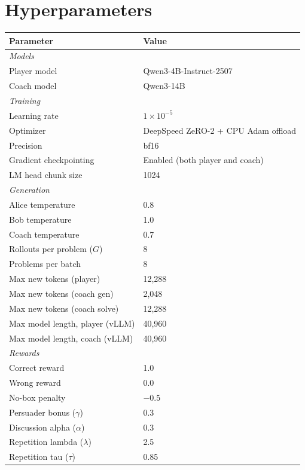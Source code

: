\documentclass{article}
\begin{document}
\section{Hyperparameters}
\label{sec:hyperparameters}

\begin{table}[h]
\centering
\small
\begin{tabular}{ll}
\toprule
\textbf{Parameter} & \textbf{Value} \\
\midrule
\multicolumn{2}{l}{\emph{Models}} \\
Player model & Qwen3-4B-Instruct-2507 \\
Coach model & Qwen3-14B \\
\midrule
\multicolumn{2}{l}{\emph{Training}} \\
Learning rate & $1 \times 10^{-5}$ \\
Optimizer & DeepSpeed ZeRO-2 + CPU Adam offload \\
Precision & bf16 \\
Gradient checkpointing & Enabled (both player and coach) \\
LM head chunk size & 1024 \\
\midrule
\multicolumn{2}{l}{\emph{Generation}} \\
Alice temperature & 0.8 \\
Bob temperature & 1.0 \\
Coach temperature & 0.7 \\
Rollouts per problem ($G$) & 8 \\
Problems per batch & 8 \\
Max new tokens (player) & 12,288 \\
Max new tokens (coach gen) & 2,048 \\
Max new tokens (coach solve) & 12,288 \\
Max model length, player (vLLM) & 40,960 \\
Max model length, coach (vLLM) & 40,960 \\
\midrule
\multicolumn{2}{l}{\emph{Rewards}} \\
Correct reward & 1.0 \\
Wrong reward & 0.0 \\
No-box penalty & $-0.5$ \\
Persuader bonus ($\gamma$) & 0.3 \\
Discussion alpha ($\alpha$) & 0.3 \\
Repetition lambda ($\lambda$) & 2.5 \\
Repetition tau ($\tau$) & 0.85 \\

\end{tabular}
\end{table}
\end{document}
